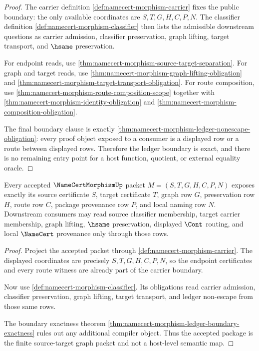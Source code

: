 \begin{proof}
The carrier definition \autoref{def:namecert-morphism-carrier} fixes the public boundary: the only available coordinates are $S,T,G,H,C,P,N$. The classifier definition \autoref{def:namecert-morphism-classifier} then lists the admissible downstream questions as carrier admission, classifier preservation, graph lifting, target transport, and $\hsame$ preservation.

For endpoint reads, use \autoref{thm:namecert-morphism-source-target-separation}. For graph and target reads, use \autoref{thm:namecert-morphism-graph-lifting-obligation} and \autoref{thm:namecert-morphism-target-transport-obligation}. For route composition, use \autoref{thm:namecert-morphism-route-composition-scope} together with \autoref{thm:namecert-morphism-identity-obligation} and \autoref{thm:namecert-morphism-composition-obligation}.

The final boundary clause is exactly \autoref{thm:namecert-morphism-ledger-nonescape-obligation}: every proof object exposed to a consumer is a displayed row or a route between displayed rows. Therefore the ledger boundary is exact, and there is no remaining entry point for a host function, quotient, or external equality oracle.
\end{proof}

\begin{theorem}
\label{thm:namecert-morphism-source-target-package}
Every accepted $\NameCertMorphismUp$ packet $M=(S,T,G,H,C,P,N)$ exposes exactly its source certificate $S$, target certificate $T$, graph row $G$, preservation row $H$, route row $C$, package provenance row $P$, and local naming row $N$. Downstream consumers may read source classifier membership, target carrier membership, graph lifting, $\hsame$ preservation, displayed $\Cont$ routing, and local $\NameCert$ provenance only through those rows.
\end{theorem}

\begin{proof}
Project the accepted packet through \autoref{def:namecert-morphism-carrier}. The displayed coordinates are precisely $S,T,G,H,C,P,N$, so the endpoint certificates and every route witness are already part of the carrier boundary.

Now use \autoref{def:namecert-morphism-classifier}. Its obligations read carrier admission, classifier preservation, graph lifting, target transport, and ledger non-escape from those same rows.

The boundary exactness theorem \autoref{thm:namecert-morphism-ledger-boundary-exactness} rules out any additional compiler object. Thus the accepted package is the finite source-target graph packet and not a host-level semantic map.
\end{proof}

